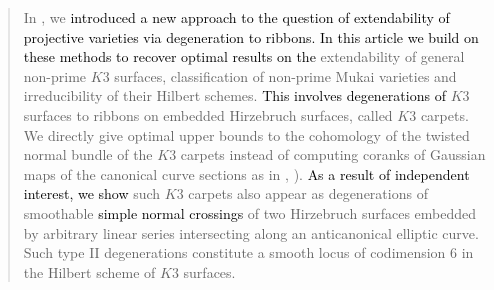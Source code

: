 \documentclass[11pt,twoside]{amsart}
\theoremstyle{plain}
\numberwithin{equation}{section}
\theoremstyle{definition}
\begin{document}
\maketitle
\begin{abstract}

In \cite{BM24}, we \textcolor{black}{introduced a new approach to the question of extendability of projective varieties via degeneration to ribbons. In this article we build on \textcolor{black}{these} methods to recover optimal results on the} extendability of general non-prime $K3$ surfaces, classification of non-prime Mukai varieties and irreducibility of their Hilbert schemes. \textcolor{black}{This involves degenerations of} $K3$ surfaces to ribbons on embedded Hirzebruch surfaces, called $K3$ carpets. We directly give optimal upper bounds to the cohomology of the twisted normal bundle of the $K3$ carpets instead of computing coranks of Gaussian maps of the canonical curve sections as in \cite{CLM94}, \cite{CLM98}). %
\textcolor{black}{As a result of independent interest, we show} such $K3$ carpets also appear as degenerations of smoothable \textcolor{black}{simple normal crossings} of two Hirzebruch surfaces embedded by arbitrary linear series intersecting along an anticanonical elliptic curve. 
Such type II degenerations constitute a smooth locus of codimension $6$ in the Hilbert scheme of $K3$ surfaces. 

\end{abstract}
\end{document}
